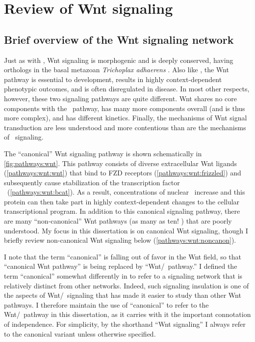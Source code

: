 \section{Review of Wnt signaling}
\label{pathways:wnt}


\subsection{Brief overview of the Wnt signaling network}

Just as with \tgfbsf, Wnt signaling is morphogenic and is deeply conserved, having
orthologs in the basal metazoan \textit{Trichoplax adhaerens} \cite{Srivastava2008}.
Also like \tgfbsf, the Wnt pathway is essential to development, results
in highly context-dependent phenotypic outcomes, and is often
disregulated in disease. In most other respects, however, these two signaling
pathways are quite different. Wnt shares no core components with the \tgfbsf\
pathway, has many more components overall (and is thus more complex), and has
different kinetics. Finally, the mechanisms of
Wnt signal transduction are less understood and more contentious than are
the mechanisms of \tgfbsf\ signaling.


The ``canonical'' Wnt signaling pathway is
shown schematically in \autoref{fig:pathways:wnt}.
This pathway consists of diverse extracellular
Wnt ligands (\autoref{pathways:wnt:wnt}) that bind to 
FZD receptors (\autoref{pathways:wnt:frizzled}) and subsequently
cause stabilization of the transcription factor \bcat\
(\autoref{pathways:wnt:bcat}). As a result, concentrations
of nuclear \bcat\ increase and this protein can then take part in
highly context-dependent changes to the cellular transcriptional
program. In addition to this canonical signaling pathway, there
are many ``non-canonical'' Wnt pathways
(as many as ten! \cite{Malhotra2009}) that are poorly understood.
My focus in this dissertation is on canonical Wnt signaling, though
I briefly review non-canonical Wnt signaling below
(\autoref{pathways:wnt:noncanon}).


I note that the term ``canonical'' is falling out of favor
in the Wnt field, so that ``canonical Wnt pathway'' is being replaced by
``Wnt/\bcat\ pathway.'' I defined the term ``canonical'' somewhat differently
in \ar{introduction:introduction} to refer to a signaling network that is
relatively distinct from other networks. Indeed, such signaling insulation
is one of the aspects of Wnt/\bcat\ signaling that has made it easier to study
than other Wnt pathways. I therefore maintain the use of ``canonical'' to
refer to the Wnt/\bcat\ pathway in this dissertation, as
it carries with it the important connotation of independence. For simplicity,
by the shorthand ``Wnt signaling'' I always refer to the canonical variant
unless otherwise specified.



